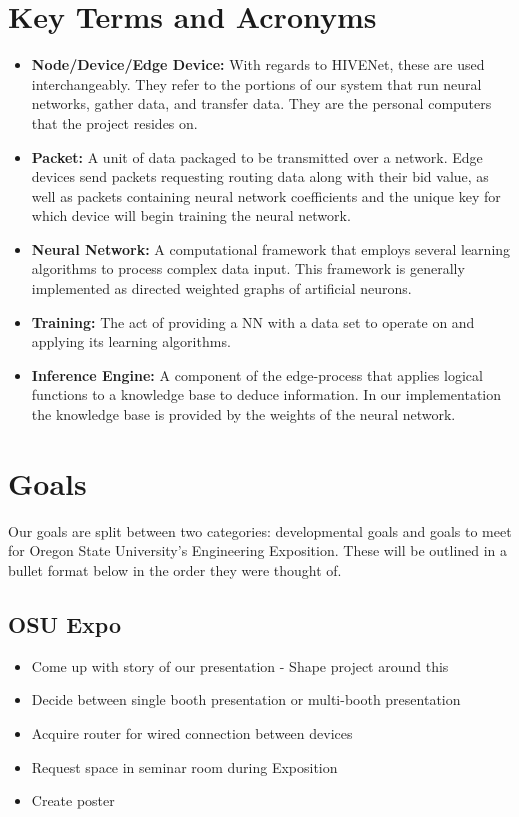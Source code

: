 \documentclass[onecolumn, draftclsnofoot,10pt, compsoc]{IEEEtran}
\begin{document}
\section{Key Terms and Acronyms}
    \begin{itemize}
        \item \textbf{Node/Device/Edge Device:} With regards to HIVENet, these are used interchangeably. 
        They refer to the portions of our system that run neural networks, gather data, and transfer data. 
        They are the personal computers that the project resides on.
        \item \textbf{Packet:} A unit of data packaged to be transmitted over a network. Edge devices send packets requesting routing data along with their bid value, as well as packets containing neural network coefficients and the unique key for which device will begin training the neural network.
        \item \textbf{Neural Network:} A computational framework that employs several learning algorithms to process complex data input.
        This framework is generally implemented as directed weighted graphs of artificial neurons.
        \item \textbf{Training:} The act of providing a NN with a data set to operate on and applying its learning algorithms.
        \item \textbf{Inference Engine:} A component of the edge-process that applies logical functions to a knowledge base to deduce information. 
        In our implementation the knowledge base is provided by the weights of the neural network.
    \end{itemize}

\section{Goals}
Our goals are split between two categories: developmental goals and goals to meet for Oregon State University's Engineering Exposition. These will be outlined in a bullet format below in the order they were thought of.
    \subsection{OSU Expo}
        \begin{itemize}
            \item Come up with story of our presentation - Shape project around this
            \item Decide between single booth presentation or multi-booth presentation
            \item Acquire router for wired connection between devices
            \item Request space in seminar room during Exposition
            \item Create poster
        \end{itemize}
        
\end{document}
